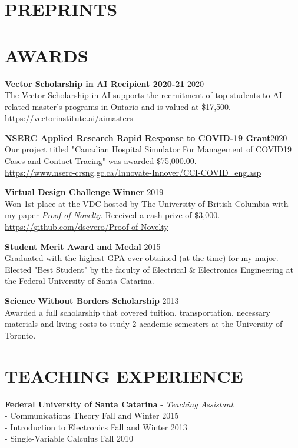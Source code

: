 \documentclass[margin, line]{res}
\begin{document}
\begin{resume}
\section{PREPRINTS}
\printbibliography[heading=none, keyword=preprint]

\section{AWARDS}
\textbf{Vector Scholarship in AI Recipient 2020-21} \hfill 2020\\
The Vector Scholarship in AI supports the recruitment of top students to AI-related master’s programs in Ontario and is valued at \$17,500.\\
\url{https://vectorinstitute.ai/aimasters}

\textbf{NSERC Applied Research Rapid Response to COVID-19 Grant}\hfill 2020\\
Our project titled "Canadian Hospital Simulator For Management of COVID19 Cases and Contact Tracing" was awarded \$75,000.00.\\
\url{https://www.nserc-crsng.gc.ca/Innovate-Innover/CCI-COVID_eng.asp}

\textbf{Virtual Design Challenge Winner} \hfill 2019\\
Won 1st place at the VDC hosted by The University of British Columbia with my paper \emph{Proof of Novelty}. Received a cash prize of \$3,000.\\
\url{https://github.com/dsevero/Proof-of-Novelty}

\textbf{Student Merit Award and Medal} \hfill 2015\\
Graduated with the highest GPA ever obtained (at the time) for my major. Elected "Best Student" by the faculty of Electrical \& Electronics Engineering at the Federal University of Santa Catarina.

\textbf{Science Without Borders Scholarship} \hfill 2013\\
Awarded a full scholarship that covered tuition, transportation, necessary materials and living costs to study 2 academic semesters at the University of Toronto.

\section{TEACHING EXPERIENCE}
\textbf{Federal University of Santa Catarina} - {\sl Teaching Assistant}\\
- Communications Theory \hfill Fall and Winter 2015\\
- Introduction to Electronics \hfill Fall and Winter 2013\\
- Single-Variable Calculus \hfill Fall 2010


\end{resume}
\end{document}
